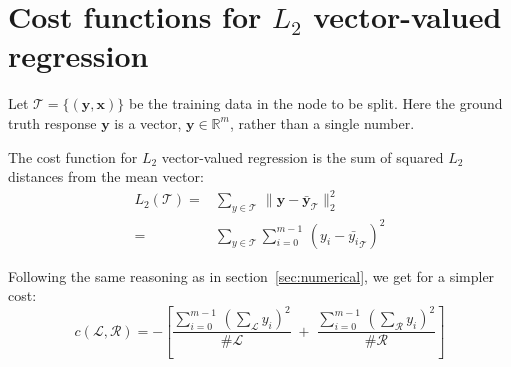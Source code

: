 \documentclass[11pt,american,usenames,dvipsnames,svgnames,x11names,table]{article}
\begin{document}
\section{Cost functions for $L_2$ vector-valued regression}

Let $\mathcal{T} = \{ \left( \mathbf{y}, \mathbf{x} \right) \}$ be the
training data in the node to be split.
Here the ground truth response $\mathbf{y}$ is a vector, 
$\mathbf{y}\in\mathbb{R}^m$, rather than a single number.

The cost function for $L_2$ vector-valued regression is the sum of
squared $L_2$ distances from the mean vector: 
\begin{align*}
L_{2}\left(\mathcal{T}\right) 
= &
\sum_{y\in\mathcal{T}}\,\|\mathbf{y}-\bar{\mathbf{y}}_{\mathcal{T}}\|_{2}^{2}\\
= &
\sum_{y\in\mathcal{T}}\sum_{i=0}^{m-1}\,\left(y_i-\bar{y_i}_{\mathcal{T}}\right)^{2}
\end{align*}

Following the same reasoning as in section~\ref{sec:numerical}, we get
for a simpler cost:
$$
c\left(\mathcal{L},\mathcal{R}\right) = 
-\left[
\frac{
\sum_{i=0}^{m-1} \, \left(\sum_{\mathcal{L}}y_i\right)^{2}}
{\#\mathcal{L}}
\; + \;
\frac{\sum_{i=0}^{m-1} \,
\left(\sum_{\mathcal{R}}y_i\right)^{2}}{\#\mathcal{R}}\right] 
$$

%
%
\end{document}
